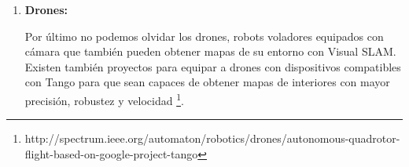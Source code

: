 \begin {enumerate}
Tanto el modelo de Dyson como Roomba utilizan una cámara de 360 grados, 
en cambio el modelo de LG utiliza una doble cámara, y es capaz de aspirar la casa incluso en la oscuridad.

\begin{figure}[H]
\begin{center}
\hspace{0.5cm}
\hspace{0.5cm}
\end{center}
\caption{Robot Dyson 360 Eye (a) Robot Roomba 966 (b) }
\end{figure}

\item \textbf{Drones:}

Por último no podemos olvidar los drones, robots voladores equipados con cámara que también pueden obtener mapas de su entorno con Visual SLAM. Existen también proyectos para equipar a drones con dispositivos compatibles con Tango para que sean capaces de obtener mapas de interiores con mayor precisión, robustez y velocidad \footnote{http://spectrum.ieee.org/automaton/robotics/drones/autonomous-quadrotor-flight-based-on-google-project-tango}.



\end{enumerate}

